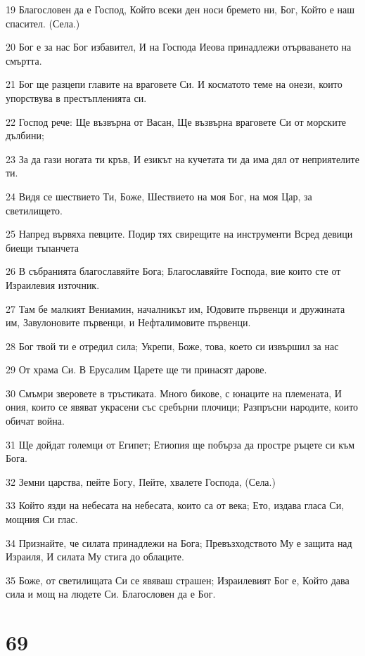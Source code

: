 \par 19 Благословен да е Господ, Който всеки ден носи бремето ни, Бог, Който е наш спасител. (Села.)
\par 20 Бог е за нас Бог избавител, И на Господа Иеова принадлежи отърваването на смъртта.
\par 21 Бог ще разцепи главите на враговете Си. И косматото теме на онези, които упорствува в престъпленията си.
\par 22 Господ рече: Ще възвърна от Васан, Ще възвърна враговете Си от морските дълбини;
\par 23 За да гази ногата ти кръв, И езикът на кучетата ти да има дял от неприятелите ти.
\par 24 Видя се шествието Ти, Боже, Шествието на моя Бог, на моя Цар, за светилището.
\par 25 Напред вървяха певците. Подир тях свирещите на инструменти Всред девици биещи тъпанчета
\par 26 В събранията благославяйте Бога; Благославяйте Господа, вие които сте от Израилевия източник.
\par 27 Там бе малкият Вениамин, началникът им, Юдовите първенци и дружината им, Завулоновите първенци, и Нефталимовите първенци.
\par 28 Бог твой ти е отредил сила; Укрепи, Боже, това, което си извършил за нас
\par 29 От храма Си. В Ерусалим Царете ще ти принасят дарове.
\par 30 Смъмри зверовете в тръстиката. Много бикове, с юнаците на племената, И ония, които се явяват украсени със сребърни плочици; Разпръсни народите, които обичат война.
\par 31 Ще дойдат големци от Египет; Етиопия ще побърза да простре ръцете си към Бога.
\par 32 Земни царства, пейте Богу, Пейте, хвалете Господа, (Села.)
\par 33 Който язди на небесата на небесата, които са от века; Ето, издава гласа Си, мощния Си глас.
\par 34 Признайте, че силата принадлежи на Бога; Превъзходството Му е защита над Израиля, И силата Му стига до облаците.
\par 35 Боже, от светилищата Си се явяваш страшен; Израилевият Бог е, Който дава сила и мощ на людете Си. Благословен да е Бог.

\chapter{69}

